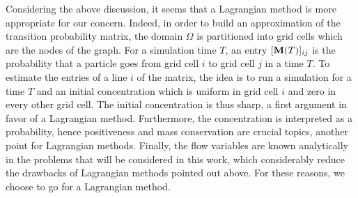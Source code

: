 Considering the above discussion, it seems that a Lagrangian method is more appropriate for our concern. Indeed, in order to build an approximation of the transition probability matrix, the domain $\Omega$ is partitioned into grid cells which are the nodes of the graph. For a simulation time $T$, an entry $[\mathbf M(T)]_{ij}$ is the probability that a particle goes from grid cell $i$ to grid cell $j$ in a time $T$. To estimate the entries of a line $i$ of the matrix, the idea is to run a simulation for a time $T$ and an initial concentration which is uniform in grid cell $i$ and zero in every other grid cell. The initial concentration is thus sharp, a first argument in favor of a Lagrangian method. Furthermore, the concentration is interpreted as a probability, hence positiveness and mass conservation are crucial topics, another point for Lagrangian methods. Finally, the flow variables are known analytically in the problems that will be considered in this work, which considerably reduce the drawbacks of Lagrangian methods pointed out above. For these reasons, we choose to go for a Lagrangian method. 


